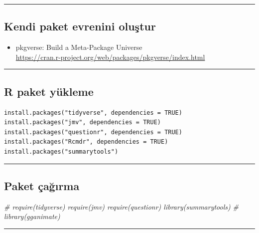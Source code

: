 \documentclass[]{article}
\newenvironment{Shaded}{\begin{snugshade}}{\end{snugshade}}
\newcommand{\CommentTok}[1]{\textcolor[rgb]{0.56,0.35,0.01}{\textit{#1}}}
\providecommand{\tightlist}{%
  \setlength{\itemsep}{0pt}\setlength{\parskip}{0pt}}
\begin{document}
\begin{center}\rule{0.5\linewidth}{\linethickness}\end{center}

\hypertarget{kendi-paket-evrenini-olustur}{%
\subsection{Kendi paket evrenini
oluştur}\label{kendi-paket-evrenini-olustur}}

\begin{itemize}
\tightlist
\item
  pkgverse: Build a Meta-Package Universe\\
  \url{https://cran.r-project.org/web/packages/pkgverse/index.html}
\end{itemize}

\begin{center}\rule{0.5\linewidth}{\linethickness}\end{center}

\hypertarget{r-paket-yukleme}{%
\subsection{R paket yükleme}\label{r-paket-yukleme}}

\begin{verbatim}
install.packages("tidyverse", dependencies = TRUE)
install.packages("jmv", dependencies = TRUE)
install.packages("questionr", dependencies = TRUE)
install.packages("Rcmdr", dependencies = TRUE)
install.packages("summarytools")
\end{verbatim}

\begin{center}\rule{0.5\linewidth}{\linethickness}\end{center}

\hypertarget{paket-cagirma}{%
\subsection{Paket çağırma}\label{paket-cagirma}}

\begin{Shaded}
\begin{Highlighting}[]
\CommentTok{# require(tidyverse) require(jmv) require(questionr) library(summarytools)}
\CommentTok{# library(gganimate)}
\end{Highlighting}
\end{Shaded}

\begin{center}\rule{0.5\linewidth}{\linethickness}\end{center}
\end{document}
